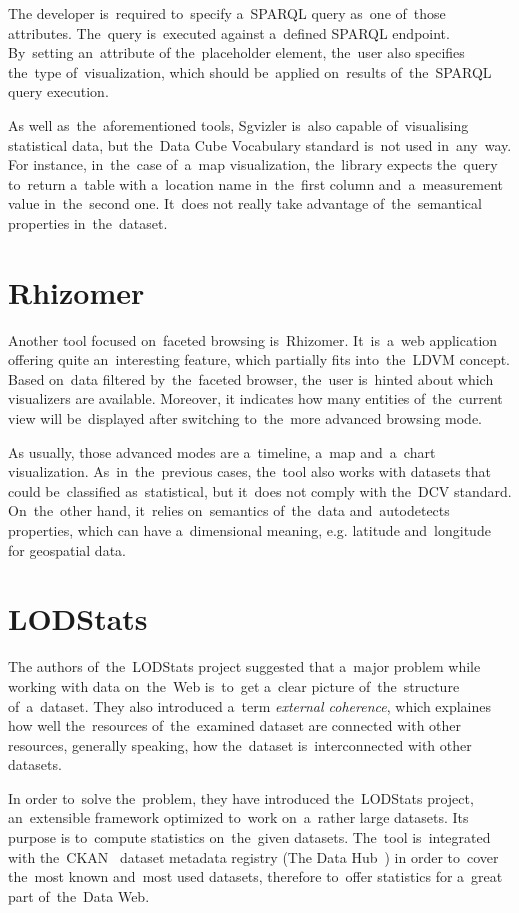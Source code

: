 The developer is~required to~specify a~SPARQL query as~one of~those attributes. The~query is~executed against a~defined SPARQL endpoint. By~setting an~attribute of
the~placeholder element, the~user also specifies the~type of~visualization, which 
should be~applied on~results of~the~SPARQL query execution.

As well as~the~aforementioned tools, Sgvizler is~also capable of~visualising statistical data, 
but the~Data Cube Vocabulary standard is~not used in~any~way. For instance, in~the~case of~a~map visualization, the~library expects the~query to~return a~table 
with a~location name in~the~first column and~a~measurement value in~the~second 
one. It~does not really take advantage of~the~semantical properties in~the~dataset.

\section{Rhizomer}
Another tool focused on~faceted browsing is~Rhizomer. It~is~a~web application 
offering quite an~interesting feature, which partially fits into~the~LDVM 
concept. Based on~data filtered by~the~faceted browser, the~user is~hinted about
which visualizers are available. Moreover, 
it indicates how many entities of~the~current view will be~displayed after 
switching to~the~more advanced browsing mode.

As usually, those advanced modes are a~timeline, a~map and~a~chart visualization. As~in~the~previous cases, the~tool also works with datasets that could be~classified as~statistical, but it~does not comply with the~DCV standard. On~the~other hand, it~relies on~semantics of~the~data and~autodetects properties, 
which can have a~dimensional meaning, e.g. latitude and~longitude for geospatial data.

\section{LODStats}
The authors of~the~LODStats project suggested that a~major 
problem while working with data on~the~Web is~to~get a~clear picture of~the~structure of~a~dataset. They also introduced a~term \emph{external coherence},
which explaines how well the~resources of~the~examined dataset are connected with 
other resources, generally speaking, how the~dataset is~interconnected with 
other datasets.

In order to~solve the~problem, they have introduced the~LODStats project, an~extensible framework optimized to~work on~a~rather large datasets. Its purpose 
is to~compute statistics on~the~given datasets. The~tool is~integrated with the~CKAN~\cite{ckan} dataset metadata registry (The Data Hub~\cite{thedatahub})
in order to~cover the~most known and~most used datasets, therefore to~offer statistics for a~great part of~the~Data 
Web.

